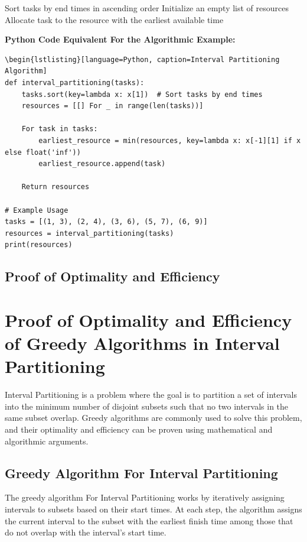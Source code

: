 \documentclass[12pt]{book} %
\begin{document}
\begin{algorithm}
\caption{Interval Partitioning Algorithm}
\begin{algorithmic}
\State Sort tasks by end times in ascending order
\State Initialize an empty list of resources
    \State Allocate task to the resource with the earliest available time
\EndFor
\end{algorithmic}
\end{algorithm}
\FloatBarrier
\textbf{Python Code Equivalent For the Algorithmic Example:}
\FloatBarrier
\begin{lstlisting}
\begin{lstlisting}[language=Python, caption=Interval Partitioning Algorithm]
def interval_partitioning(tasks):
    tasks.sort(key=lambda x: x[1])  # Sort tasks by end times
    resources = [[] For _ in range(len(tasks))]
    
    For task in tasks:
        earliest_resource = min(resources, key=lambda x: x[-1][1] if x else float('inf'))
        earliest_resource.append(task)
    
    Return resources
    
# Example Usage
tasks = [(1, 3), (2, 4), (3, 6), (5, 7), (6, 9)]
resources = interval_partitioning(tasks)
print(resources)
\end{lstlisting}

\subsection{Proof of Optimality and Efficiency}
\section{Proof of Optimality and Efficiency of Greedy Algorithms in Interval Partitioning}

Interval Partitioning is a problem where the goal is to partition a set of intervals into the minimum number of disjoint subsets such that no two intervals in the same subset overlap. Greedy algorithms are commonly used to solve this problem, and their optimality and efficiency can be proven using mathematical and algorithmic arguments.

\subsection{Greedy Algorithm For Interval Partitioning}

The greedy algorithm For Interval Partitioning works by iteratively assigning intervals to subsets based on their start times. At each step, the algorithm assigns the current interval to the subset with the earliest finish time among those that do not overlap with the interval's start time.
\end{document}
